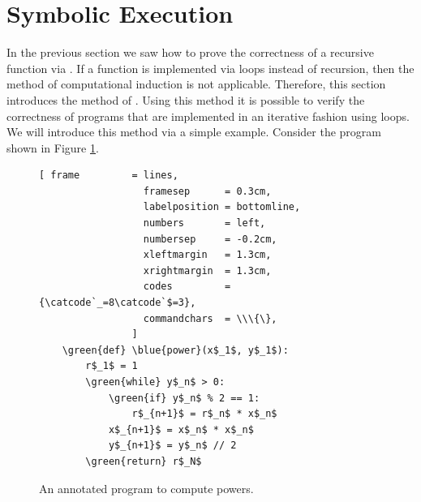\section{Symbolic Execution}
In the previous section we saw how to prove the correctness of a recursive function via
.  If a function is implemented via loops instead of recursion, then the method
of computational induction is not applicable.  Therefore, this section introduces the method of
.   Using this method it is possible to verify the
correctness of programs that are implemented in an iterative fashion using loops. 
We will introduce this method via a simple example.  Consider the program shown in Figure
\ref{fig:power-iterative-annotated.stlx}. 

\begin{figure}[!h]
\centering
\begin{Verbatim}[ frame         = lines, 
                  framesep      = 0.3cm, 
                  labelposition = bottomline,
                  numbers       = left,
                  numbersep     = -0.2cm,
                  xleftmargin   = 1.3cm,
                  xrightmargin  = 1.3cm,
                  codes         = {\catcode`_=8\catcode`$=3},
                  commandchars  = \\\{\},
                ]
    \green{def} \blue{power}(x$_1$, y$_1$):
        r$_1$ = 1
        \green{while} y$_n$ > 0:
            \green{if} y$_n$ % 2 == 1:
                r$_{n+1}$ = r$_n$ * x$_n$
            x$_{n+1}$ = x$_n$ * x$_n$
            y$_{n+1}$ = y$_n$ // 2
        \green{return} r$_N$
\end{Verbatim}
\vspace*{-0.3cm}
\caption{An annotated program to compute powers.}
\label{fig:power-iterative-annotated.stlx}
\end{figure} %

